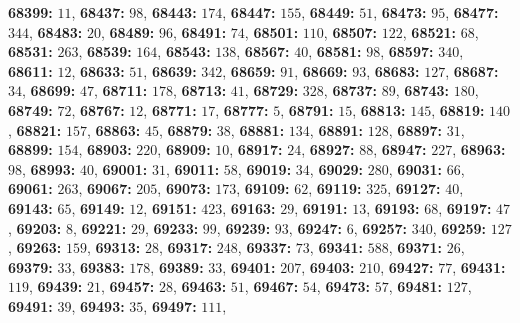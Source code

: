 \textsf{\bfseries 68399:} $11$, \textsf{\bfseries 68437:} $98$, \textsf{\bfseries 68443:} $174$, \textsf{\bfseries 68447:} $155$, \textsf{\bfseries 68449:} $51$, \textsf{\bfseries 68473:} $95$, \textsf{\bfseries 68477:} $344$, \textsf{\bfseries 68483:} $20$, \textsf{\bfseries 68489:} $96$, \textsf{\bfseries 68491:} $74$, \textsf{\bfseries 68501:} $110$, \textsf{\bfseries 68507:} $122$, \textsf{\bfseries 68521:} $68$, \textsf{\bfseries 68531:} $263$, \textsf{\bfseries 68539:} $164$, \textsf{\bfseries 68543:} $138$, \textsf{\bfseries 68567:} $40$, \textsf{\bfseries 68581:} $98$, \textsf{\bfseries 68597:} $340$, \textsf{\bfseries 68611:} $12$, \textsf{\bfseries 68633:} $51$, \textsf{\bfseries 68639:} $342$, \textsf{\bfseries 68659:} $91$, \textsf{\bfseries 68669:} $93$, \textsf{\bfseries 68683:} $127$, \textsf{\bfseries 68687:} $34$, \textsf{\bfseries 68699:} $47$, \textsf{\bfseries 68711:} $178$, \textsf{\bfseries 68713:} $41$, \textsf{\bfseries 68729:} $328$, \textsf{\bfseries 68737:} $89$, \textsf{\bfseries 68743:} $180$, \textsf{\bfseries 68749:} $72$, \textsf{\bfseries 68767:} $12$, \textsf{\bfseries 68771:} $17$, \textsf{\bfseries 68777:} $5$, \textsf{\bfseries 68791:} $15$, \textsf{\bfseries 68813:} $145$, \textsf{\bfseries 68819:} $140$, \textsf{\bfseries 68821:} $157$, \textsf{\bfseries 68863:} $45$, \textsf{\bfseries 68879:} $38$, \textsf{\bfseries 68881:} $134$, \textsf{\bfseries 68891:} $128$, \textsf{\bfseries 68897:} $31$, \textsf{\bfseries 68899:} $154$, \textsf{\bfseries 68903:} $220$, \textsf{\bfseries 68909:} $10$, \textsf{\bfseries 68917:} $24$, \textsf{\bfseries 68927:} $88$, \textsf{\bfseries 68947:} $227$, \textsf{\bfseries 68963:} $98$, \textsf{\bfseries 68993:} $40$, \textsf{\bfseries 69001:} $31$, \textsf{\bfseries 69011:} $58$, \textsf{\bfseries 69019:} $34$, \textsf{\bfseries 69029:} $280$, \textsf{\bfseries 69031:} $66$, \textsf{\bfseries 69061:} $263$, \textsf{\bfseries 69067:} $205$, \textsf{\bfseries 69073:} $173$, \textsf{\bfseries 69109:} $62$, \textsf{\bfseries 69119:} $325$, \textsf{\bfseries 69127:} $40$, \textsf{\bfseries 69143:} $65$, \textsf{\bfseries 69149:} $12$, \textsf{\bfseries 69151:} $423$, \textsf{\bfseries 69163:} $29$, \textsf{\bfseries 69191:} $13$, \textsf{\bfseries 69193:} $68$, \textsf{\bfseries 69197:} $47$, \textsf{\bfseries 69203:} $8$, \textsf{\bfseries 69221:} $29$, \textsf{\bfseries 69233:} $99$, \textsf{\bfseries 69239:} $93$, \textsf{\bfseries 69247:} $6$, \textsf{\bfseries 69257:} $340$, \textsf{\bfseries 69259:} $127$, \textsf{\bfseries 69263:} $159$, \textsf{\bfseries 69313:} $28$, \textsf{\bfseries 69317:} $248$, \textsf{\bfseries 69337:} $73$, \textsf{\bfseries 69341:} $588$, \textsf{\bfseries 69371:} $26$, \textsf{\bfseries 69379:} $33$, \textsf{\bfseries 69383:} $178$, \textsf{\bfseries 69389:} $33$, \textsf{\bfseries 69401:} $207$, \textsf{\bfseries 69403:} $210$, \textsf{\bfseries 69427:} $77$, \textsf{\bfseries 69431:} $119$, \textsf{\bfseries 69439:} $21$, \textsf{\bfseries 69457:} $28$, \textsf{\bfseries 69463:} $51$, \textsf{\bfseries 69467:} $54$, \textsf{\bfseries 69473:} $57$, \textsf{\bfseries 69481:} $127$, \textsf{\bfseries 69491:} $39$, \textsf{\bfseries 69493:} $35$, \textsf{\bfseries 69497:} $111$, 
